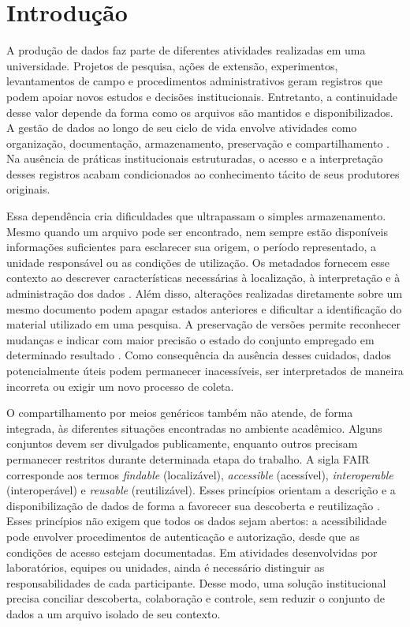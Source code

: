 \chapter{Introdução}\label{chp:INTRODUCAO}

A produção de dados faz parte de diferentes atividades realizadas em uma universidade. Projetos de pesquisa, ações de extensão, experimentos, levantamentos de campo e procedimentos administrativos geram registros que podem apoiar novos estudos e decisões institucionais. Entretanto, a continuidade desse valor depende da forma como os arquivos são mantidos e disponibilizados. A gestão de dados ao longo de seu ciclo de vida envolve atividades como organização, documentação, armazenamento, preservação e compartilhamento \cite{higgins2008dcc}. Na ausência de práticas institucionais estruturadas, o acesso e a interpretação desses registros acabam condicionados ao conhecimento tácito de seus produtores originais.

Essa dependência cria dificuldades que ultrapassam o simples armazenamento. Mesmo quando um arquivo pode ser encontrado, nem sempre estão disponíveis informações suficientes para esclarecer sua origem, o período representado, a unidade responsável ou as condições de utilização. Os metadados fornecem esse contexto ao descrever características necessárias à localização, à interpretação e à administração dos dados \cite{riley2017metadata}. Além disso, alterações realizadas diretamente sobre um mesmo documento podem apagar estados anteriores e dificultar a identificação do material utilizado em uma pesquisa. A preservação de versões permite reconhecer mudanças e indicar com maior precisão o estado do conjunto empregado em determinado resultado \cite{klump2021versioning}. Como consequência da ausência desses cuidados, dados potencialmente úteis podem permanecer inacessíveis, ser interpretados de maneira incorreta ou exigir um novo processo de coleta.

O compartilhamento por meios genéricos também não atende, de forma integrada, às diferentes situações encontradas no ambiente acadêmico. Alguns conjuntos devem ser divulgados publicamente, enquanto outros precisam permanecer restritos durante determinada etapa do trabalho. A sigla FAIR corresponde aos termos \textit{findable} (localizável), \textit{accessible} (acessível), \textit{interoperable} (interoperável) e \textit{reusable} (reutilizável). Esses princípios orientam a descrição e a disponibilização de dados de forma a favorecer sua descoberta e reutilização \cite{wilkinson2016fair}. Esses princípios não exigem que todos os dados sejam abertos: a acessibilidade pode envolver procedimentos de autenticação e autorização, desde que as condições de acesso estejam documentadas. Em atividades desenvolvidas por laboratórios, equipes ou unidades, ainda é necessário distinguir as responsabilidades de cada participante. Desse modo, uma solução institucional precisa conciliar descoberta, colaboração e controle, sem reduzir o conjunto de dados a um arquivo isolado de seu contexto.

